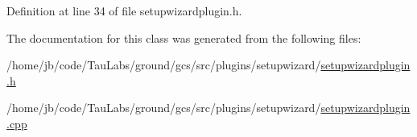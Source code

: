 \-Definition at line 34 of file setupwizardplugin.\-h.



\-The documentation for this class was generated from the following files\-:\begin{DoxyCompactItemize}
\item 
/home/jb/code/\-Tau\-Labs/ground/gcs/src/plugins/setupwizard/\hyperlink{setupwizardplugin_8h}{setupwizardplugin.\-h}\item 
/home/jb/code/\-Tau\-Labs/ground/gcs/src/plugins/setupwizard/\hyperlink{setupwizardplugin_8cpp}{setupwizardplugin.\-cpp}\end{DoxyCompactItemize}
